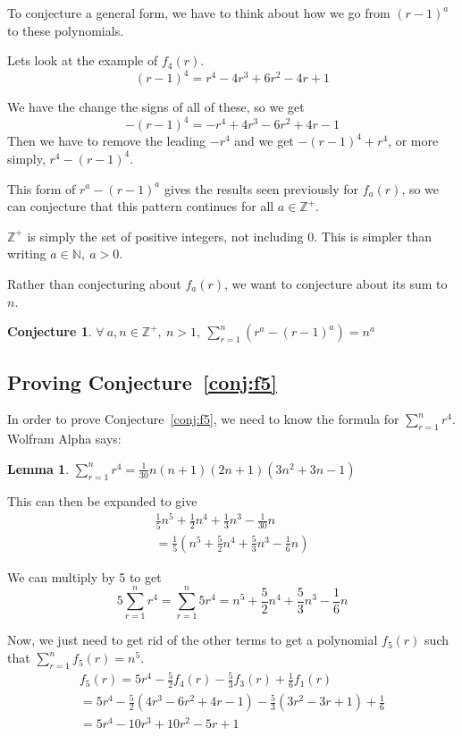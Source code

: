 \documentclass[a4paper]{article}
\newcommand{\sn}{\sum\limits_{r=1}^{n}}
\newcommand{\inn}{\in \mathbb{N}}
\newcommand{\oo}[1]{\frac{1}{#1}}
\newcommand{\zp}{\mathbb{Z}^+}
\newtheorem{lemma}{Lemma}
\newtheorem{conjecture}{Conjecture}
\begin{document}
To conjecture a general form, we have to think about how we go from $(r-1)^a$ to these polynomials.

Lets look at the example of $f_4(r)$. $$(r-1)^4 = r^4 - 4r^3 + 6r^2 - 4r + 1$$

We have the change the signs of all of these, so we get $$-(r-1)^4 = -r^4 + 4r^3 - 6r^2 + 4r - 1$$ Then we have to remove the leading $-r^4$ and we get $-(r-1)^4 + r^4$, or more simply, $r^4 - (r-1)^4$.

This form of $r^a - (r-1)^a$ gives the results seen previously for $f_a(r)$, so we can conjecture that this pattern continues for all $a \in \zp$.

$\zp$ is simply the set of positive integers, not including 0. This is simpler than writing $a \inn,\ a > 0$.

Rather than conjecturing about $f_a(r)$, we want to conjecture about its sum to $n$.
\begin{conjecture}
$\displaystyle \forall\ a, n \in \zp,\ n > 1,\ \sn \left(r^a - (r - 1)^a\right) = n^a$
\label{conj:fa_sum}
\end{conjecture}

\subsection{Proving Conjecture~\ref{conj:f5}}

In order to prove Conjecture~\ref{conj:f5}, we need to know the formula for $\sn r^4$. Wolfram Alpha says:

\begin{lemma}
$\displaystyle \sn r^4 = \oo{30}n(n + 1)(2n + 1)\left(3n^2 + 3n - 1\right)$
\label{lem:sum_r4}
\end{lemma}

This can then be expanded to give
\begin{gather*}
\oo{5}n^5 + \oo{2}n^4 + \oo{3}n^3 - \oo{30}n\\[0.2em]
= \oo{5}\left(n^5 + \frac{5}{2}n^4 + \frac{5}{3}n^3 - \oo{6}n\right)
\end{gather*}

We can multiply by 5 to get $$5 \sn r^4 = \sn 5r^4 = n^5 + \frac{5}{2}n^4 + \frac{5}{3}n^3 - \oo{6}n$$

Now, we just need to get rid of the other terms to get a polynomial $f_5(r)$ such that $\sn f_5(r) = n^5$.
\begin{gather*}
f_5(r) = 5r^4 - \frac{5}{2}f_4(r) - \frac{5}{3}f_3(r) + \oo{6}f_1(r)\\
= 5r^4 - \frac{5}{2}\left(4r^3 - 6r^2 + 4r - 1\right) - \frac{5}{3}\left(3r^2 - 3r + 1\right) + \oo{6}\\
= 5r^4 - 10r^3 + 10r^2 - 5r + 1
\end{gather*}
\end{document}
